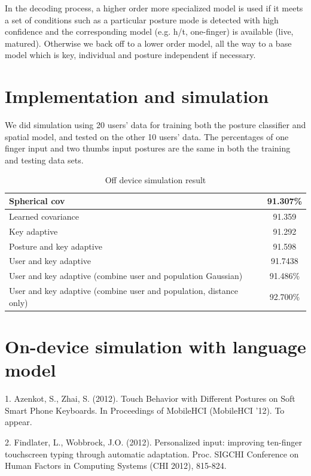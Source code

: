 \documentclass{sigchi}
\begin{document}
In the decoding process, a higher order more specialized model is used if it meets a set of conditions such as a particular posture mode is detected with high confidence and the corresponding model (e.g. h/t, one-finger) is available (live, matured). Otherwise we back off to a lower order model, all the way to a base model which is key, individual and posture independent if necessary.

\section{Implementation and simulation}

We did simulation using 20 users' data for training both the posture
classifier and spatial model, and tested on the other 10 users' data. The
percentages of one finger input and two thumbs input postures are the same in
both the training and testing data sets.

\begin{table}[tb]
  \centering
  \begin{tabularx}{\columnwidth}{|X|c|}
  \hline
  Spherical cov & 91.307\% \\
  \hline
  Learned covariance & 91.359 \\
  \hline
  Key adaptive  & 91.292 \\
  Posture and key adaptive  & 91.598 \\
  User and key adaptive & 91.7438 \\
  User and key adaptive (combine user and population Gaussian)  & 91.486\% \\
  User and key adaptive (combine user and population, distance only) &  92.700\%
  \\
  \end{tabularx}
  \caption{Off device simulation result}
  \label{tab:off-device}
\end{table}

\section{On-device simulation with language model}


1. Azenkot, S.,  Zhai, S. (2012). Touch Behavior with Different Postures on Soft Smart Phone Keyboards. In Proceedings of MobileHCI (MobileHCI '12). To appear.

2. Findlater, L., Wobbrock, J.O. (2012). Personalized input: improving ten-finger touchscreen typing through automatic adaptation. Proc. SIGCHI Conference on Human Factors in Computing Systems (CHI 2012), 815-824.
\end{document}
